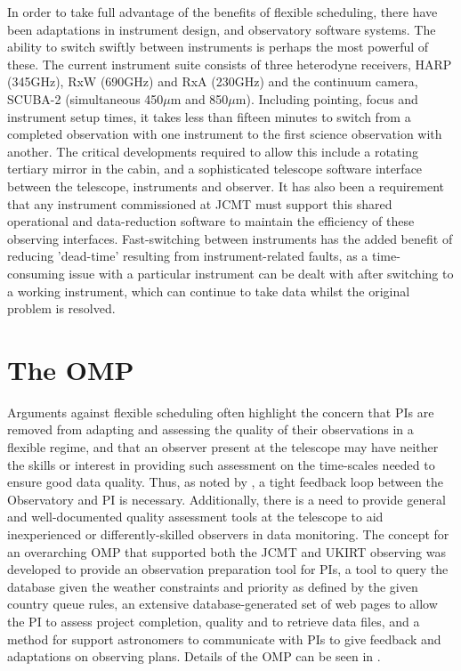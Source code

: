 \documentclass[]{spie}  %
\begin{document}
In order to take full advantage of the benefits of flexible
scheduling, there have been adaptations in instrument design, and
observatory software systems. The ability to switch swiftly between
instruments is perhaps the most powerful of these. The current
instrument suite consists of three heterodyne receivers, HARP
(345GHz), RxW (690GHz) and RxA (230GHz) and the continuum camera,
SCUBA-2 (simultaneous 450$\mu$m and 850$\mu$m). Including pointing,
focus and instrument setup times, it takes less than fifteen minutes
to switch from a completed observation with one instrument to the
first science observation with another. The critical developments
required to allow this include a rotating tertiary mirror in the
cabin, and a sophisticated telescope software interface between the
telescope, instruments and observer.\cite{rees2002,2011tfa..confE..42J} It has also
been a requirement that any instrument commissioned at JCMT must
support this shared operational and data-reduction software to
maintain the efficiency of these observing interfaces. Fast-switching
between instruments has the added benefit of reducing 'dead-time'
resulting from instrument-related faults, as a time-consuming issue
with a particular instrument can be dealt with after switching to a
working instrument, which can continue to take data whilst the
original problem is resolved.



\section{The OMP}\label{sec:omp}

Arguments against flexible scheduling often highlight the concern that
PIs are removed from adapting and assessing the quality of their
observations in a flexible regime, and that an observer present at the
telescope may have neither the skills or interest in providing such
assessment on the time-scales needed to ensure good data
quality. Thus, as noted by \cite{tilanus2000}, a tight feedback loop
between the Observatory and PI is necessary. Additionally, there is a
need to provide general and well-documented quality assessment tools
at the telescope to aid inexperienced or differently-skilled observers
in data monitoring. The concept for an overarching OMP that supported
both the JCMT and UKIRT observing was developed to provide an
observation preparation tool for PIs, a tool to query the database
given the weather constraints and priority as defined by the given
country queue rules, an extensive database-generated set of web pages
to allow the PI to assess project completion, quality and to retrieve
data files, and a method for support astronomers to communicate with
PIs to give feedback and adaptations on observing plans. Details of
the OMP can be seen in \cite{2011tfa..confE..42J}.
\end{document}
